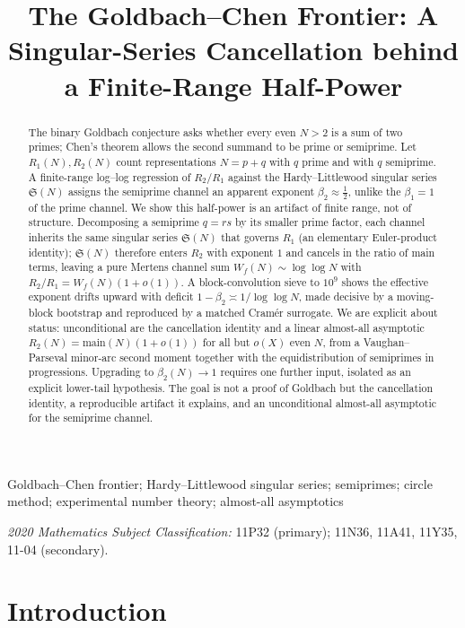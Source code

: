 \documentclass[]{interact}%
\title{The Goldbach--Chen Frontier: A Singular-Series Cancellation behind a Finite-Range Half-Power}
\author{
\name{Mathias Rodr\'iguez Castro\textsuperscript{a}\thanks{CONTACT Mathias Rodr\'iguez Castro. Email: mathiasr@fing.edu.uy. ORCID: 0009-0002-7235-7677.}}
\affil{\textsuperscript{a}Facultad de Ingenier\'ia, Universidad de la Rep\'ublica, Montevideo, Uruguay}
}
\newcommand{\sing}{\mathfrak S}
\begin{document}

\maketitle

\begin{abstract}
The binary Goldbach conjecture asks whether every even $N>2$ is a sum of two primes; Chen's
theorem allows the second summand to be prime or semiprime. Let $R_1(N),R_2(N)$ count
representations $N=p+q$ with $q$ prime and with $q$ semiprime. A finite-range log--log regression
of $R_2/R_1$ against the Hardy--Littlewood singular series $\sing(N)$ assigns the semiprime channel
an apparent exponent $\beta_2\approx\tfrac12$, unlike the $\beta_1=1$ of the prime channel. We show
this half-power is an artifact of finite range, not of structure. Decomposing a semiprime $q=rs$ by
its smaller prime factor, each channel inherits the same singular series $\sing(N)$ that governs
$R_1$ (an elementary Euler-product identity); $\sing(N)$ therefore enters $R_2$ with exponent $1$
and cancels in the ratio of main terms, leaving a pure Mertens channel sum $W_f(N)\sim\log\log N$
with $R_2/R_1=W_f(N)(1+o(1))$. A block-convolution sieve to $10^{9}$ shows the effective exponent
drifts upward with deficit $1-\beta_2\asymp1/\log\log N$, made decisive by a moving-block bootstrap
and reproduced by a matched Cram\'er surrogate. We are explicit about status: unconditional are the
cancellation identity and a linear almost-all asymptotic $R_2(N)=\mathrm{main}(N)(1+o(1))$ for all
but $o(X)$ even $N$, from a Vaughan--Parseval minor-arc second moment together with the
equidistribution of semiprimes in progressions. Upgrading to $\beta_2(N)\to1$ requires one further
input, isolated as an explicit lower-tail hypothesis. The goal is not a proof of Goldbach but the
cancellation identity, a reproducible artifact it explains, and an unconditional almost-all
asymptotic for the semiprime channel.
\end{abstract}

\begin{keywords}
Goldbach--Chen frontier; Hardy--Littlewood singular series; semiprimes; circle method; experimental number theory; almost-all asymptotics
\end{keywords}

\medskip\noindent\textit{2020 Mathematics Subject Classification:} 11P32 (primary); 11N36, 11A41, 11Y35, 11-04 (secondary).

\section{Introduction}
\end{document}
